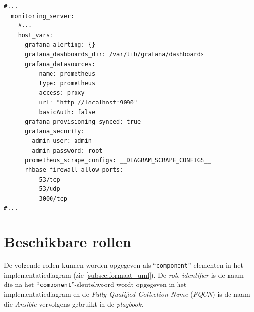 \begin{codeblockfixed}
  \begin{codeblock}
    \begin{verbatim}
#...
  monitoring_server:
    #...
    host_vars:
      grafana_alerting: {}
      grafana_dashboards_dir: /var/lib/grafana/dashboards
      grafana_datasources:
        - name: prometheus
          type: prometheus
          access: proxy
          url: "http://localhost:9090"
          basicAuth: false
      grafana_provisioning_synced: true
      grafana_security:
        admin_user: admin
        admin_password: root
      prometheus_scrape_configs: __DIAGRAM_SCRAPE_CONFIGS__
      rhbase_firewall_allow_ports:
        - 53/tcp
        - 53/udp
        - 3000/tcp
#...
\end{verbatim}
    \caption[``\texttt{host\_vars}'' in ``\texttt{role-config.yml}'']{``\texttt{host\_vars}''-key van een rol in ``\texttt{role-config.yml}''}
    \label{code:vb_roleconfig_host_vars}
  \end{codeblock}
\end{codeblockfixed}

\section{Beschikbare rollen}%
\label{sec:beschikbare_rollen}

De volgende rollen kunnen worden opgegeven als ``\texttt{component}''-elementen in het implementatiediagram (zie \autoref{subsec:formaat_uml}).
De \emph{role identifier} is de naam die na het ``\texttt{component}''-sleutelwoord wordt opgegeven in het implementatiediagram en de \emph{Fully Qualified Collection Name} (\emph{FQCN}) is de naam die \emph{Ansible} vervolgens gebruikt in de \emph{playbook}.


